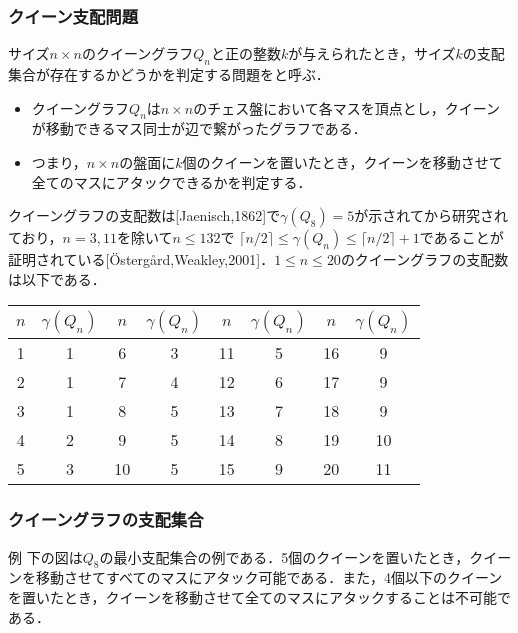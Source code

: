 \documentclass[dvipdfmx,10pt]{beamer}
\begin{document}
\begin{frame}\frametitle{クイーン支配問題}
 \begin{block}{}
  サイズ$n\times n$のクイーングラフ$Q_n$と正の整数$k$が与えられたとき，サイズ$k$の支配集合が存在するかどうかを判定する問題をと呼ぶ．
  \begin{itemize}
   \item クイーングラフ$Q_n$は$n \times n$のチェス盤において各マスを頂点とし，クイーンが移動できるマス同士が辺で繋がったグラフである．
   \item つまり，$n \times n$の盤面に$k$個のクイーンを置いたとき，クイーンを移動させて全てのマスにアタックできるかを判定する．
  \end{itemize}
 \end{block}
 \begin{block}{}
  クイーングラフの支配数は[Jaenisch,1862]で$\gamma (Q_{8})=5$が示されてから研究されており，$n=3,11$を除いて$n \leq 132$で $\lceil n/2 \rceil \leq \gamma(Q_{n}) \leq \lceil n/2 \rceil +1$であることが証明されている[\"{O}sterg{\aa}rd,Weakley,2001]．$1\leq n \leq 20$のクイーングラフの支配数は以下である．
  \begin{table}[hbtp]
   \centering
   \begin{tabular}{|c|c||c|c||c|c||c|c|} \hline
    $n$ & $\gamma(Q_{n})$ & $n$ & $\gamma(Q_{n})$ &$n$ & $\gamma(Q_{n})$ &$n$ & $\gamma(Q_{n})$ \\ \hline
    1 &1 &6 &3 &11 &5 &16 &9 \\ \hline
    2 &1 &7 &4 &12 &6 &17 &9 \\ \hline
    3 &1 &8 &5 &13 &7 &18 &9 \\ \hline
    4 &2 &9 &5 &14 &8 &19 &10 \\ \hline
    5 &3 &10 &5 &15 &9 &20 &11 \\ \hline
   \end{tabular}
  \end{table}
 \end{block}
\end{frame}

%
%

\begin{frame}\frametitle{クイーングラフの支配集合}
 \begin{exampleblock}{例}
  下の図は$Q_8$の最小支配集合の例である．5個のクイーンを置いたとき，クイーンを移動させてすべてのマスにアタック可能である．また，4個以下のクイーンを置いたとき，クイーンを移動させて全てのマスにアタックすることは不可能である．
  \begin{center}
   \scalebox{0.5}{
   
   }
  \end{center}
 \end{exampleblock}
\end{frame}
\end{document}
